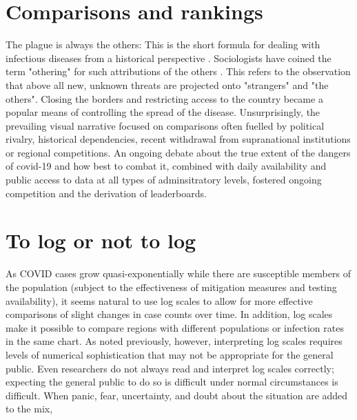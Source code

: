 \documentclass[article]{jdssv}\usepackage[]{graphicx}\usepackage[]{color}
\begin{document}
\section[]{Comparisons and rankings}
\label{sec:rankings}

The plague is always the others: This is the short formula for dealing with infectious diseases from a historical perspective \citep{thiessen2021}. Sociologists have coined the term "othering" for such attributions of the others \citep{mountz2009}. This refers to the observation that above all new, unknown threats are projected onto "strangers" and "the others". Closing the borders and restricting access to the country became a popular means of controlling the spread of the disease. Unsurprisingly, the prevailing visual narrative focused on comparisons often fuelled by political rivalry, historical dependencies, recent withdrawal from supranational institutions or regional competitions. An ongoing debate about the true extent of the dangers of covid-19 and how best to combat it, combined with daily availability and public access to data at all types of adminsitratory levels, fostered ongoing competition and the derivation of leaderboards. 



\section{To log or not to log}
As COVID cases grow quasi-exponentially while there are susceptible members of the population (subject to the effectiveness of mitigation measures and testing availability), it seems natural to use log scales to allow for more effective comparisons of slight changes in case counts over time. In addition, log scales make it possible to compare regions with different populations or infection rates in the same chart. As noted previously, however, interpreting log scales requires levels of numerical sophistication that may not be appropriate for the general public. Even researchers do not always read and interpret log scales correctly\citep{mengeLogarithmicScalesEcological2018}; expecting the general public to do so is difficult under normal circumstances\citep{hecklerStudentAccuracyReading2013} is difficult. When panic, fear, uncertainty, and doubt about the situation are added to the mix, 
\end{document}
